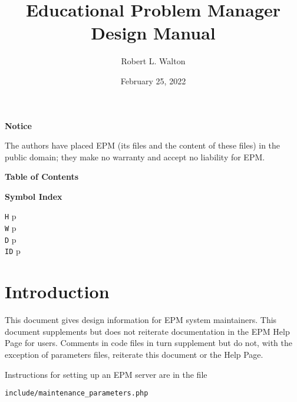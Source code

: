 \documentclass[12pt]{article}
\makeatletter
\renewcommand\tableofcontents{%
    \begin{list}{}%
	     {\setlength{\itemsep}{0in}%
	      \setlength{\topsep}{0in}%
	      \setlength{\parsep}{1ex}%
	      \setlength{\labelwidth}{0in}%
	      \setlength{\baselineskip}{1.5ex}%
	      \setlength{\leftmargin}{0.8in}%
	      \setlength{\rightmargin}{0.8in}}%
    \item\@starttoc{toc}%
    \end{list}}
\newcommand{\pagref}[1]{p\pageref{#1}}
\makeatother
\begin{document}
        
\title{Educational Problem Manager\\
Design Manual}

\author{Robert L. Walton}

\date{February 25, 2022}
 
\maketitle

\begin{center}
{\large \bf Notice}
\\[2ex]
\begin{minipage}{5.5in}
The authors have placed EPM (its files and the content of these files) in
the public domain; they make no warranty and accept
no liability for EPM.
\end{minipage}
\end{center}
\begin{center}
\large \bf Table of Contents
\end{center}

\bigskip

\tableofcontents 

\newpage

\begin{center}
{\bf Symbol Index}
\\[1ex]
\begin{minipage}{2in}
{\tt H} \dotfill \pagref{H-DIRECTORY} \\
{\tt W} \dotfill \pagref{W-DIRECTORY} \\
{\tt D} \dotfill \pagref{D-DIRECTORY} \\
{\tt ID} \dotfill \pagref{AIDS}
\end{minipage}
\end{center}


\newpage

\section{Introduction}

This document gives design information for EPM system maintainers.
This document supplements but does not reiterate
documentation in the EPM Help Page for
users.  Comments in code files in turn supplement but do not, with
the exception of parameters files,
reiterate this document or the Help Page.

Instructions for setting up an EPM server are in the file
\begin{center}
{\tt include/maintenance\_parameters.php}
\end{center}
\end{document}
